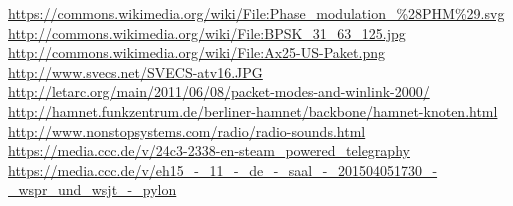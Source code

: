 \begin{thebibliography}{}
                    \url{https://commons.wikimedia.org/wiki/File:Phase_modulation_\%28PHM\%29.svg}\\
                    \url{http://commons.wikimedia.org/wiki/File:BPSK_31_63_125.jpg}\\
                    \url{http://commons.wikimedia.org/wiki/File:Ax25-US-Paket.png}
       \url{http://www.svecs.net/SVECS-atv16.JPG}
      \url{http://letarc.org/main/2011/06/08/packet-modes-and-winlink-2000/}
    \url{http://hamnet.funkzentrum.de/berliner-hamnet/backbone/hamnet-knoten.html}
       \url{http://www.nonstopsystems.com/radio/radio-sounds.html}
     \url{https://media.ccc.de/v/24c3-2338-en-steam_powered_telegraphy}
      \url{https://media.ccc.de/v/eh15_-_11_-_de_-_saal_-_201504051730_-_wspr_und_wsjt_-_pylon}
\end{thebibliography} 


